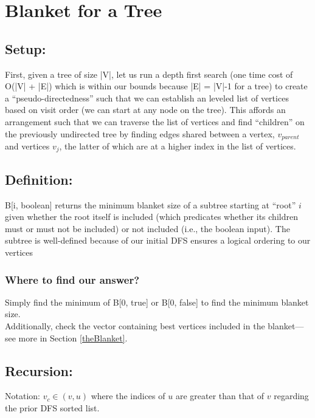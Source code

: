 \documentclass[conference]{styles/acmsiggraph}
\newcommand{\?}{\stackrel{?}{=}}
\begin{document}
\newpage



\section{Blanket for a Tree}

\subsection{Setup:}
First, given a tree of size |V|, let us run a depth first search (one time cost of O(|V| + |E|) which is within our bounds because |E| = |V|-1 for a tree) to create a \enquote{pseudo-directedness} such that we can establish an leveled list of vertices based on visit order (we can start at any node on the tree).  This affords an arrangement such that we can traverse the list of vertices and find \enquote{children} on the previously undirected tree by finding edges shared between a vertex, $v_{parent}$ and vertices $v_j$, the latter of which are at a higher index in the list of vertices.

\subsection{Definition:}
B[i, boolean] returns the minimum blanket size of a subtree starting at \enquote{root} $i$ given whether the root itself is included (which predicates whether its children must or must not be included) or not included (i.e., the boolean input).  The subtree is well-defined because of our initial DFS ensures a logical ordering to our vertices 

\subsubsection*{Where to find our answer?}
Simply find the minimum of B[0, true] or B[0, false] to find the minimum blanket size.\\
Additionally, check the vector containing best vertices included in the blanket---see more in Section \ref{theBlanket}.

\subsection{Recursion:}
Notation: $v_c \in (v, u)$ where the indices of $u$ are greater than that of $v$ regarding the prior DFS sorted list.
\end{document}
